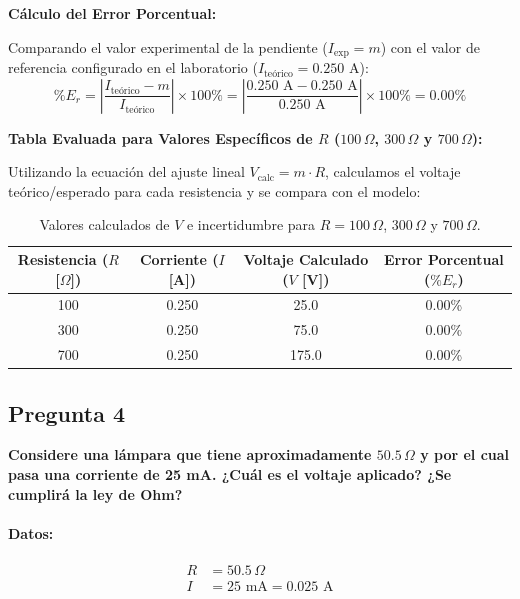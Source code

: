 \documentclass[12pt,a4paper]{article}
\begin{document}
    \textbf{Cálculo del Error Porcentual:}
    
    Comparando el valor experimental de la pendiente ($I_{\text{exp}} = m$) con el valor de referencia configurado en el laboratorio ($I_{\text{teórico}} = 0.250\text{ A}$):
    \[
    \%E_r = \left| \frac{I_{\text{teórico}} - m}{I_{\text{teórico}}} \right| \times 100\% = \left| \frac{0.250\text{ A} - 0.250\text{ A}}{0.250\text{ A}} \right| \times 100\% = 0.00\%
    \]

    \textbf{Tabla Evaluada para Valores Específicos de $R$ ($100\,\Omega$, $300\,\Omega$ y $700\,\Omega$):}

    Utilizando la ecuación del ajuste lineal $V_{\text{calc}} = m \cdot R$, calculamos el voltaje teórico/esperado para cada resistencia y se compara con el modelo:

    \begin{table}[H]
    \centering
    \small %
    \begin{tabular}{|c|c|c|c|}
        \hline
        \textbf{Resistencia ($R$ [$\Omega$])} & \textbf{Corriente ($I$ [A])} & \textbf{Voltaje Calculado ($V$ [V])} & \textbf{Error Porcentual ($\%E_r$)} \\ \hline
        100 & 0.250 & 25.0 & 0.00\% \\ \hline
        300 & 0.250 & 75.0 & 0.00\% \\ \hline
        700 & 0.250 & 175.0 & 0.00\% \\ \hline
    \end{tabular}
    \caption{Valores calculados de $V$ e incertidumbre para $R = 100\,\Omega$, $300\,\Omega$ y $700\,\Omega$.}
    \label{tab:cuestionario_p3}
\end{table}

\subsection*{Pregunta 4}
\textbf{Considere una lámpara que tiene aproximadamente $50.5\,\Omega$ y por el cual pasa una corriente de 25 mA. ¿Cuál es el voltaje aplicado? ¿Se cumplirá la ley de Ohm?}

\paragraph{Datos:}
\begin{align*}
R &= 50.5\,\Omega \\
I &= 25\text{ mA} = 0.025\text{ A}
\end{align*}
\end{document}
